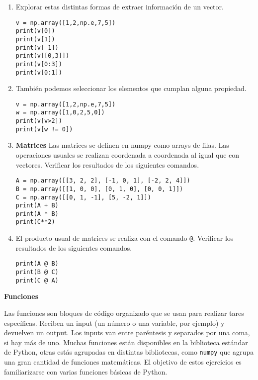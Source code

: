 \documentclass[a4paper,11pt]{article}
\theoremstyle{definition}
\begin{document}
\begin{enumerate}
\item Explorar estas distintas formas de extraer información de un vector.
\begin{lstlisting}
v = np.array([1,2,np.e,7,5])
print(v[0])
print(v[1])
print(v[-1])
print(v[[0,3]])
print(v[0:3])
print(v[0:1])
\end{lstlisting}

\item También podemos seleccionar los elementos que cumplan alguna propiedad.
\begin{lstlisting}
v = np.array([1,2,np.e,7,5])
w = np.array([1,0,2,5,0])
print(v[v>2])
print(v[w != 0])
\end{lstlisting}

\item \textbf{Matrices} Las matrices se definen en numpy como arrays de filas. Las operaciones usuales se realizan coordenada a coordenada al igual que con vectores.
Verificar los resultados de los siguientes comandos.

\begin{lstlisting}
A = np.array([[3, 2, 2], [-1, 0, 1], [-2, 2, 4]])
B = np.array([[1, 0, 0], [0, 1, 0], [0, 0, 1]])
C = np.array([[0, 1, -1], [5, -2, 1]])
print(A + B)
print(A * B)
print(C**2)
\end{lstlisting}

\item El producto usual de matrices se realiza con el comando \lstinline{@}. Verificar los resultados de los siguientes comandos.
\begin{lstlisting}
print(A @ B)
print(B @ C)
print(C @ A)
\end{lstlisting}

\end{enumerate}
\textbf{\large Funciones}

Las funciones son bloques de código organizado que se usan para realizar tares específicas. Reciben un input (un número o una variable, por ejemplo) y devuelven un output. Los inputs van entre par\'entesis y separados por una coma, si hay m\'as de uno. Muchas funciones están disponibles en la biblioteca est\'andar de Python, otras estás agrupadas en distintas bibliotecas, como \lstinline{numpy} que agrupa una gran cantidad de funciones matemáticas. El objetivo de estos ejercicios es familiarizarse con varias funciones básicas de Python.
\end{document}
